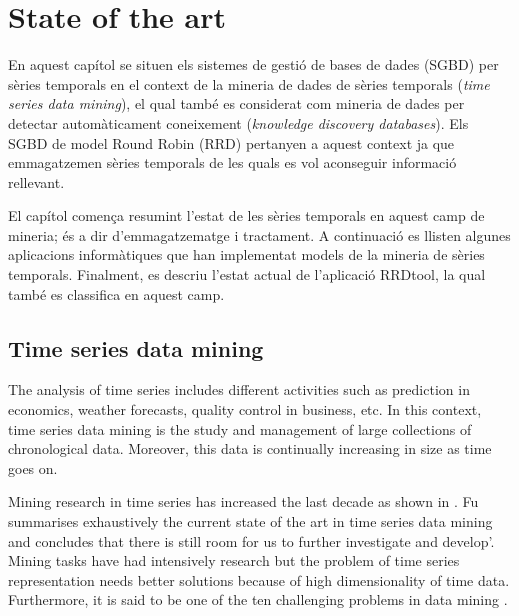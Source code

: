 \section{State of the art}



En aquest capítol se situen els sistemes de gestió de bases de dades (SGBD) per sèries temporals en el context de la mineria de dades de sèries temporals (\emph{time series data mining}), el qual també es considerat com mineria de dades per  detectar automàticament coneixement (\emph{knowledge discovery databases}). Els SGBD de model Round Robin (RRD) pertanyen a aquest context ja que  emmagatzemen sèries temporals  de les quals es vol aconseguir informació rellevant.


El capítol comença resumint l'estat de les sèries temporals en aquest camp de mineria; és a dir d'emmagatzematge i tractament. A continuació es llisten algunes aplicacions informàtiques que han implementat models de la mineria de sèries temporals. Finalment, es descriu l'estat actual de l'aplicació RRDtool, la qual també es classifica en aquest camp.



\subsection{Time series data mining}

The analysis of time series includes different activities such as prediction in economics, weather forecasts, quality control in business, etc. In this context, time series data mining is the study and management of large collections of chronological data. Moreover, this data is continually increasing in size as time goes on.

Mining research in time series has increased the last decade as shown in \textcite{fu11}. Fu summarises exhaustively the current state of the art in time series data mining  and concludes that there is still room for us to further investigate and develop'. Mining tasks have had intensively research but the problem of  time series representation needs better solutions because of high dimensionality of time data. Furthermore, it is said to be one of the ten challenging problems in data mining \parencite{yangwu06}.
 
